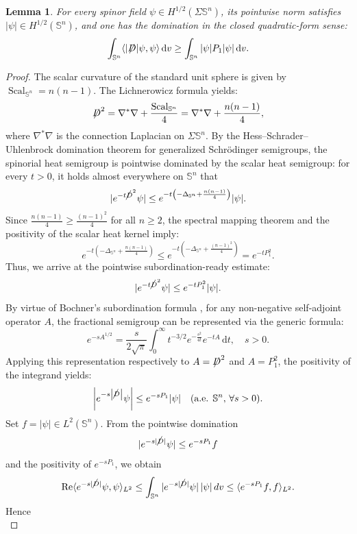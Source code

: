 \documentclass[a4paper, 12pt]{article}
\newtheorem{lemma}[theorem]{Lemma}
\def\slashiii#1{\setbox0=\hbox{$#1$}#1\hskip-\wd0\hbox to\wd0{\hss\sl/\/\hss}}
\begin{document}
\begin{lemma}\label{Dirac-Laplace}
	For every spinor field $\psi \in H^{1/2}(\Sigma \mathbb{S}^n)$, its pointwise norm satisfies $|\psi| \in H^{1/2}(\mathbb{S}^n)$, and one has the domination in the closed quadratic-form sense:
	$$
	\int_{\mathbb{S}^n} \langle |\slashiii{D}|\psi, \psi \rangle \, \text{d}v \ge \int_{\mathbb{S}^n} |\psi| P_1 |\psi| \, \text{d}v.
	$$
\end{lemma}
\begin{proof}
	The scalar curvature of the standard unit sphere is given by $\operatorname{Scal}_{\mathbb{S}^n} = n(n-1)$. The Lichnerowicz formula yields:
	$$
	\slashiii{D}^2 = \nabla^* \nabla + \frac{\operatorname{Scal}_{\mathbb{S}^n}}{4} = \nabla^* \nabla + \frac{n(n-1)}{4},
	$$
	where $\nabla^* \nabla$ is the connection Laplacian on $\Sigma \mathbb{S}^n$. By the Hess–Schrader–Uhlenbrock domination  theorem \cite{MR458243} for generalized Schrödinger semigroups, the spinorial heat semigroup is pointwise dominated by the scalar heat semigroup: for every $t > 0$, it holds almost everywhere on $\mathbb{S}^n$ that
	$$
	|e^{-t \slashiii{D}^2} \psi| \le e^{-t \left( -\Delta_{\mathbb{S}^n} + \frac{n(n-1)}{4} \right)} |\psi|.
	$$
	Since $\frac{n(n-1)}{4} \ge \frac{(n-1)^2}{4}$ for all $n \ge 2$, the spectral mapping theorem and the positivity of the scalar heat kernel imply:
	$$
	e^{-t \left( -\Delta_{\mathbb{S}^n} + \frac{n(n-1)}{4} \right)} \le e^{-t \left( -\Delta_{\mathbb{S}^n} + \frac{(n-1)^2}{4} \right)} = e^{-t P_1^2}.
	$$
	Thus, we arrive at the pointwise subordination-ready estimate:
	$$
	|e^{-t \slashiii{D}^2} \psi| \le e^{-t P_1^2} |\psi|.
	$$
	By virtue of Bochner's subordination formula \cite[Chapter IX]{MR617913}, for any non-negative self-adjoint operator $A$, the fractional semigroup can be represented via the generic formula:
	$$
	e^{-s A^{1/2}} = \frac{s}{2\sqrt{\pi}} \int_0^\infty t^{-3/2} e^{-\frac{s^2}{4t}} e^{-tA} \, \text{d}t, \quad s > 0.
	$$
	Applying this representation respectively to $A = \slashiii{D}^2$ and $A = P_1^2$, the positivity of the integrand yields:
	$$
	\left| e^{-s \left|\slashiii{D}\right|} \psi\right|  \le e^{-s P_1} |\psi| \quad (\text{a.e. } \mathbb{S}^n, \, \forall s > 0).
	$$
	Set $f=|\psi|\in L^2(\mathbb S^n)$. From the pointwise domination
	\[
	|e^{-s|\slashiii{D}|}\psi|\le e^{-sP_1}f
	\]
	and the positivity of \(e^{-sP_1}\), we obtain
	\[
	\operatorname{Re}\langle e^{-s|\slashiii{D}|}\psi,\psi\rangle_{L^2}
	\le
	\int_{\mathbb S^n}|e^{-s|\slashiii{D}|}\psi|\,|\psi|\,dv
	\le
	\langle e^{-sP_1}f,f\rangle_{L^2}.
	\]
	Hence
	\[
\]
\end{proof}
\end{document}
